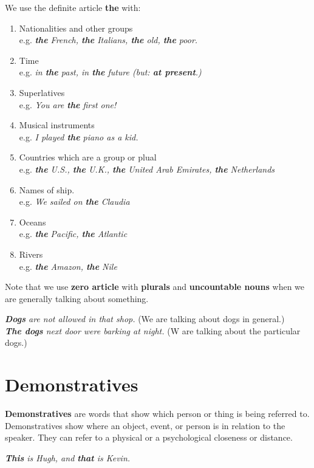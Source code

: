 \documentclass[hidelinks,10pt,a4paper]{article}
\begin{document}
We use the definite article \textbf{the} with:
\begin{enumerate}[label=\alph*)]
\item Nationalities and other groups\\
		e.g. \textit{ \textbf{the} French, \textbf{the} Italians, \textbf{the} old, \textbf{the} poor.}
\item Time\\
		e.g. \textit{in \textbf{the} past, in \textbf{the} future (but: \textbf{at present}.)}
\item Superlatives\\
		e.g. \textit{You are \textbf{the} first one!}
\item Musical instruments\\
		e.g. \textit{I played \textbf{the} piano as a kid.}
\item Countries which are a group or plual\\
		e.g. \textit{ \textbf{the} U.S., \textbf{the} U.K., \textbf{the} United Arab Emirates, \textbf{the} Netherlands }
\item Names of ship.\\
		e.g. \textit{We sailed on \textbf{the} Claudia}
\item Oceans\\
		e.g. \textit{ \textbf{the} Pacific, \textbf{the} Atlantic}
\item Rivers\\
		e.g. \textit{ \textbf{the} Amazon, \textbf{the} Nile}
\end{enumerate}

Note that we use \textbf{zero article} with \textbf{plurals} and \textbf{uncountable nouns} when we are generally talking about something.
\begin{center}
		\textit{ \textbf{Dogs} are not allowed in that shop.} (We are talking about dogs in general.)\\
		\textit{ \textbf{The dogs} next door were barking at night.} (W are talking about the particular dogs.)
\end{center}

\section{Demonstratives}

\textbf{Demonstratives} are words that show which person or thing is being referred to.
Demonstratives show where an object, event, or person is in relation to the speaker. They can refer to a physical or a psychological closeness or distance.
\begin{center}
		\textit{\textbf{This} is Hugh, and \textbf{that} is Kevin.}
\end{center}
\end{document}
